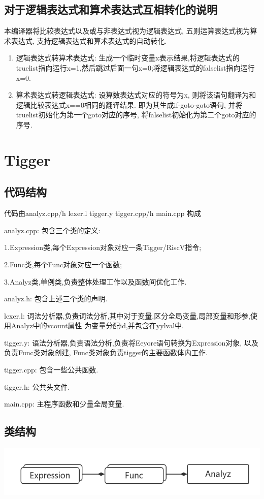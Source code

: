 \documentclass[UTF8]{article}
\begin{document}
\subsection{对于逻辑表达式和算术表达式互相转化的说明}
本编译器将比较表达式以及或与非表达式视为逻辑表达式, 五则运算表达式视为算术表达式, 支持逻辑表达式和算术表达式的自动转化.

\begin{enumerate}[(1)]
\item 逻辑表达式转算术表达式: 生成一个临时变量x表示结果,将逻辑表达式的truelist指向运行x=1,然后跳过后面一句x=0;将逻辑表达式的falselist指向运行x=0.
\item 算术表达式转逻辑表达式: 设算数表达式对应的符号为x, 则将该语句翻译为和逻辑比较表达式x==0相同的翻译结果. 即为其生成if-goto-goto语句, 并将truelist初始化为第一个goto对应的序号, 将falselist初始化为第二个goto对应的序号.
\end{enumerate}
\section{Tigger}
\subsection{代码结构}
代码由analyz.cpp/h lexer.l tigger.y tigger.cpp/h main.cpp 构成

analyz.cpp: 包含三个类的定义: 

	1.Expression类,每个Expression对象对应一条Tigger/RiscV指令;
	
	2.Func类,每个Func对象对应一个函数; 
	
	3.Analyz类,单例类,负责整体处理工作以及函数间优化工作. 

analyz.h: 包含上述三个类的声明.

lexer.l: 词法分析器,负责词法分析,其中对于变量,区分全局变量,局部变量和形参,使用Analyz中的vcount属性
为变量分配id,并包含在yylval中.

tigger.y: 语法分析器,负责语法分析,负责将Eeyore语句转换为Expression对象, 以及负责Func类对象创建, Func类对象负责tigger的主要函数体内工作.

tigger.cpp: 包含一些公共函数.

tigger.h: 公共头文件.

main.cpp: 主程序函数和少量全局变量.
\subsection{类结构}
\includegraphics[width=0.7\linewidth]{uml} 
\end{document}
